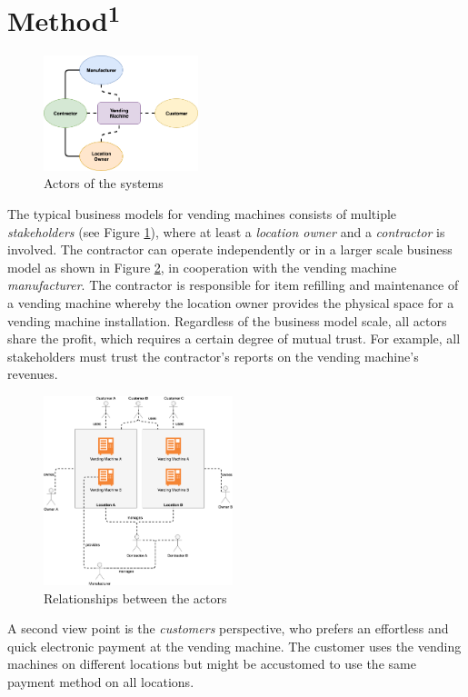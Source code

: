 \section{Method\textsuperscript{1}}
\begin{figure}[ht]
    \centering
    \includegraphics[width=0.4\textwidth]{assets/relations.png}
    \caption{Actors of the systems}
    \label{fig:relations}
\end{figure}
The typical business models for vending machines consists of multiple \textit{stakeholders} (see Figure \ref{fig:relations}), where at least a \textit{location owner} and a \textit{contractor} is involved. The contractor can operate independently or in a larger scale business model as shown in Figure \ref{fig:relations2}, in cooperation with the vending machine \textit{manufacturer}. The contractor is responsible for item refilling and maintenance of a vending machine whereby the location owner provides the physical space for a vending machine installation. Regardless of the business model scale, all actors share the profit, which requires a certain degree of mutual trust. For example, all stakeholders must trust the contractor's reports on the vending machine's revenues.
\begin{figure}[ht]
    \centering
    \includegraphics[width=0.49\textwidth]{assets/relations2.png}
    \caption{Relationships between the actors}
    \label{fig:relations2}
\end{figure}
A second view point is the \textit{customers} perspective, who prefers an effortless and quick electronic payment at the vending machine. The customer uses the vending machines on different locations but might be accustomed to use the same payment method on all locations. \\
